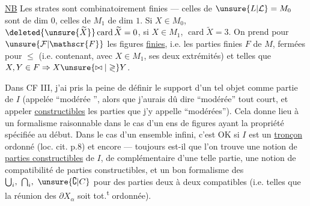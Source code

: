 
\uline{NB} Les strates sont combinatoirement finies --- celles de $\unsure{L|\mathcal{L}}=M_0$ sont de dim $0$, celles de $M_1$ de dim $1$. Si $X\in M_0$, $\deleted{\unsure{\widetilde{X}}}\operatorname{card}\widetilde{X}=0$, si $X\in M_1$, $\operatorname{card}\widetilde{X}=3$. On prend pour $\unsure{\mathcal{F}|\mathscr{F}}$ les figures \uline{finies}, i.e. les parties finies $F$ de $M$,  fermées pour $\leq$ (i.e. contenant, avec  $X\in M_1$, ses deux extrémités) et telles que $X,Y\in F\Rightarrow X\unsure{\bowtie|\gtrless}Y$.



Dans CF III, j'ai pris la peine  de définir le support d'un tel objet comme partie de $I$ (appelée  ``modérée '', alors que j'aurais dû dire ``modérée'' tout court, et appeler \uline{constructibles} les parties que j'y appelle ``modérées''). Cela donne lieu à un formalisme raisonnable dans le cas  d'un ens  de figures ayant la propriété spécifiée au début. Dans le cas d'un ensemble infini, c'est OK si $I$ est un \uline{tronçon} ordonné (loc. cit. p.8) et encore --- toujours est-il que l'on trouve une notion de \uline{parties constructibles} de $I$, de complémentaire d'une telle partie,  une notion de compatibilité de parties constructibles, et un bon formalisme des $\bigcup_i,\ \bigcap_i,\ \unsure{\complement|C}$ pour des parties   deux à deux  compatibles (i.e. telles que la réunion des $\partial X_\alpha$ soit tot.\textsuperscript{t} ordonnée).

